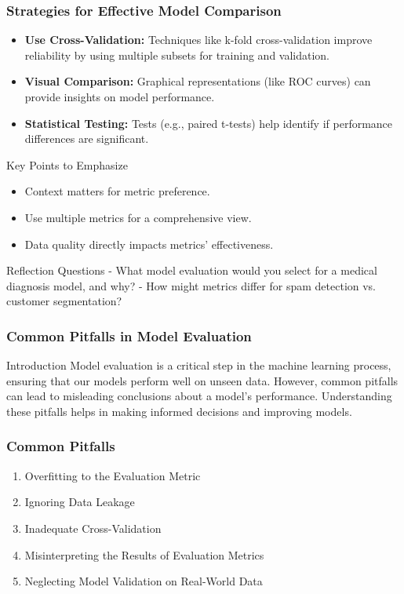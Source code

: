 \documentclass[aspectratio=169]{beamer}
\begin{document}
\begin{frame}[fragile]
    \frametitle{Strategies for Effective Model Comparison}
    \begin{itemize}
        \item \textbf{Use Cross-Validation:} Techniques like k-fold cross-validation improve reliability by using multiple subsets for training and validation.
        \item \textbf{Visual Comparison:} Graphical representations (like ROC curves) can provide insights on model performance.
        \item \textbf{Statistical Testing:} Tests (e.g., paired t-tests) help identify if performance differences are significant.
    \end{itemize}
    
    \begin{block}{Key Points to Emphasize}
        \begin{itemize}
            \item Context matters for metric preference.
            \item Use multiple metrics for a comprehensive view.
            \item Data quality directly impacts metrics' effectiveness.
        \end{itemize}
    \end{block}

    \begin{block}{Reflection Questions}
        - What model evaluation would you select for a medical diagnosis model, and why?
        - How might metrics differ for spam detection vs. customer segmentation?
    \end{block}
\end{frame}

\begin{frame}[fragile]
  \frametitle{Common Pitfalls in Model Evaluation}
  \begin{block}{Introduction}
    Model evaluation is a critical step in the machine learning process, ensuring that our models perform well on unseen data. However, common pitfalls can lead to misleading conclusions about a model's performance. Understanding these pitfalls helps in making informed decisions and improving models.
  \end{block}
\end{frame}

\begin{frame}[fragile]
  \frametitle{Common Pitfalls}
  \begin{enumerate}
    \item Overfitting to the Evaluation Metric
    \item Ignoring Data Leakage
    \item Inadequate Cross-Validation
    \item Misinterpreting the Results of Evaluation Metrics
    \item Neglecting Model Validation on Real-World Data
  \end{enumerate}
\end{frame}
\end{document}
